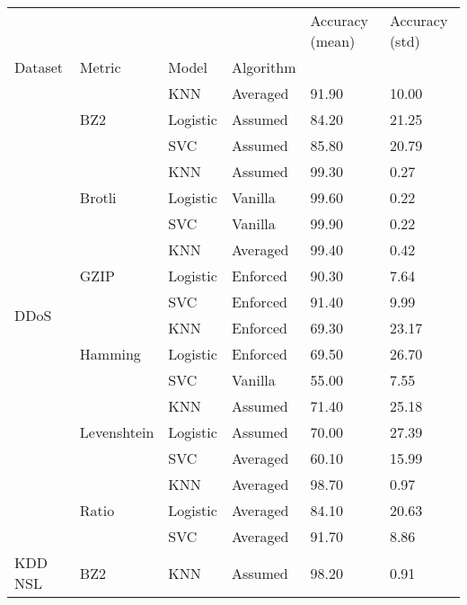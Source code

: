 \begin{tabularx}{\textwidth}{llllll}
\toprule
 &  &  &  & Accuracy (mean) & Accuracy (std) \\
Dataset & Metric & Model & Algorithm &  &  \\
\midrule
\multirow[t]{18}{*}{DDoS} & \multirow[t]{3}{*}{BZ2} & KNN & Averaged & 91.90 & 10.00 \\
\cline{3-6}
 &  & Logistic & Assumed & 84.20 & 21.25 \\
\cline{3-6}
 &  & SVC & Assumed & 85.80 & 20.79 \\
\cline{2-6} \cline{3-6}
 & \multirow[t]{3}{*}{Brotli} & KNN & Assumed & 99.30 & 0.27 \\
\cline{3-6}
 &  & Logistic & Vanilla & 99.60 & 0.22 \\
\cline{3-6}
 &  & SVC & Vanilla & 99.90 & 0.22 \\
\cline{2-6} \cline{3-6}
 & \multirow[t]{3}{*}{GZIP} & KNN & Averaged & 99.40 & 0.42 \\
\cline{3-6}
 &  & Logistic & Enforced & 90.30 & 7.64 \\
\cline{3-6}
 &  & SVC & Enforced & 91.40 & 9.99 \\
\cline{2-6} \cline{3-6}
 & \multirow[t]{3}{*}{Hamming} & KNN & Enforced & 69.30 & 23.17 \\
\cline{3-6}
 &  & Logistic & Enforced & 69.50 & 26.70 \\
\cline{3-6}
 &  & SVC & Vanilla & 55.00 & 7.55 \\
\cline{2-6} \cline{3-6}
 & \multirow[t]{3}{*}{Levenshtein} & KNN & Assumed & 71.40 & 25.18 \\
\cline{3-6}
 &  & Logistic & Assumed & 70.00 & 27.39 \\
\cline{3-6}
 &  & SVC & Averaged & 60.10 & 15.99 \\
\cline{2-6} \cline{3-6}
 & \multirow[t]{3}{*}{Ratio} & KNN & Averaged & 98.70 & 0.97 \\
\cline{3-6}
 &  & Logistic & Averaged & 84.10 & 20.63 \\
\cline{3-6}
 &  & SVC & Averaged & 91.70 & 8.86 \\
\cline{1-6} \cline{2-6} \cline{3-6}
\multirow[t]{18}{*}{KDD NSL} & \multirow[t]{3}{*}{BZ2} & KNN & Assumed & 98.20 & 0.91 \\

\end{tabularx}
